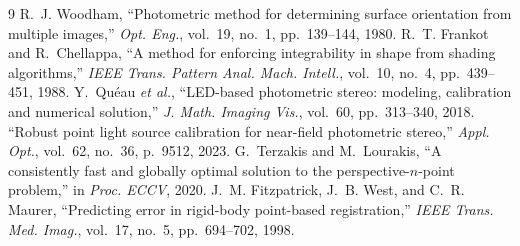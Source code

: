 \documentclass[journal]{IEEEtran}
\begin{document}
\begin{thebibliography}{9}\small
{} R.~J. Woodham, ``Photometric method for determining surface
orientation from multiple images,'' \emph{Opt. Eng.}, vol.~19, no.~1, pp.~139--144,
1980.
 R.~T. Frankot and R.~Chellappa, ``A method for enforcing integrability in
shape from shading algorithms,'' \emph{IEEE Trans. Pattern Anal. Mach. Intell.},
vol.~10, no.~4, pp.~439--451, 1988.
 Y.~Qu\'eau \emph{et al.}, ``LED-based photometric stereo: modeling,
calibration and numerical solution,'' \emph{J. Math. Imaging Vis.}, vol.~60,
pp.~313--340, 2018.
 ``Robust point light source calibration for near-field photometric
stereo,'' \emph{Appl. Opt.}, vol.~62, no.~36, p.~9512, 2023.
 G.~Terzakis and M.~Lourakis, ``A consistently fast and globally
optimal solution to the perspective-$n$-point problem,'' in \emph{Proc. ECCV}, 2020.
 J.~M. Fitzpatrick, J.~B. West, and C.~R. Maurer, ``Predicting
error in rigid-body point-based registration,'' \emph{IEEE Trans. Med. Imag.},
vol.~17, no.~5, pp.~694--702, 1998.
\end{thebibliography}
\end{document}
